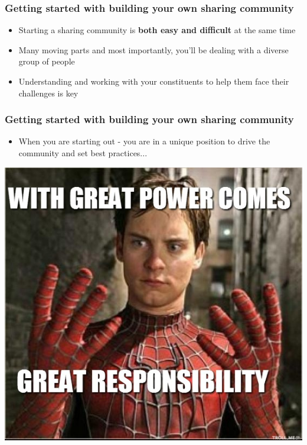 \begin{frame}
\frametitle{Getting started with building your own sharing community}
\begin{itemize}
	\item Starting a sharing community is {\bf both easy and difficult} at the same time
	\item Many moving parts and most importantly, you'll be dealing with a diverse group of people
	\item Understanding and working with your constituents to help them face their challenges is key
\end{itemize}
\end{frame}

\begin{frame}
\frametitle{Getting started with building your own sharing community}
\begin{itemize}
	\item When you are starting out - you are in a unique position to drive the community and set best practices...
\end{itemize}
\includegraphics[scale=0.3]{screenshots/power-responsibility.png}
\end{frame}

